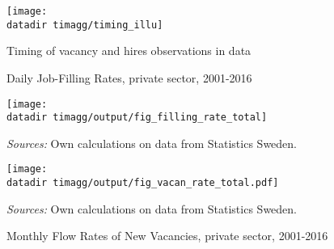 
\begin{figure}[t]
\centering
\caption{Timing of vacancy and hires observations in data}
\texttt{[image: \\datadir timagg/timing\_illu]}
\flushleft
\footnotesize{}
\label{fig:timing_illustration}
\end{figure}


\begin{figure}[t]
\centering
\caption{Daily Job-Filling Rates, private sector, 2001-2016}
\label{fig:aggregate_filling_rates}
\texttt{[image: \\datadir timagg/output/fig\_filling\_rate\_total]}
\begin{flushleft}
\footnotesize{\emph{Sources:}  Own calculations on data from Statistics Sweden.}
\end{flushleft}
\vspace{5mm}

\centering
\caption{Monthly Flow Rates of New Vacancies, private sector, 2001-2016}
\label{fig:aggregate_creation_rates}
\texttt{[image: \\datadir timagg/output/fig\_vacan\_rate\_total.pdf]}
\begin{flushleft}
\footnotesize{\emph{Sources:} Own calculations on data from Statistics Sweden.}
\end{flushleft}
\end{figure}

